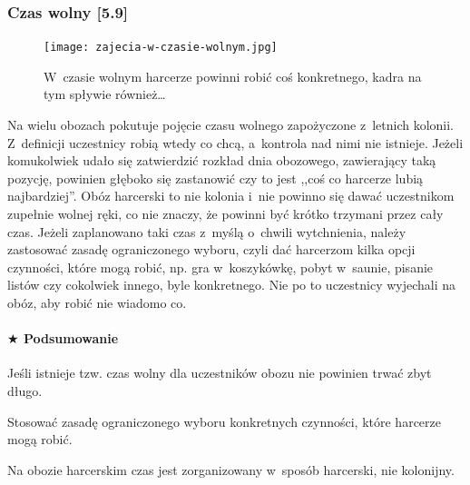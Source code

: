 \documentclass[a5paper,10pt,titlepage,twoside]{article}
\newcommand*{\thecheckbox}{\hss$\Box$} %
\newenvironment*{checklist}
{\list{}{%
\renewcommand*{\makelabel}[1]{\thecheckbox}}}
{\endlist}
\begin{document}
\subsubsection{Czas wolny [5.9]}
\begin{figure}[htp]
\centering
\texttt{[image: zajecia-w-czasie-wolnym.jpg]}
\caption{W~czasie wolnym harcerze powinni robić coś konkretnego, kadra na tym spływie również\ldots}\label{fig:czas-wolny}
\end{figure}
Na wielu obozach pokutuje pojęcie czasu wolnego zapożyczone z~letnich kolonii. Z~definicji uczestnicy robią wtedy co chcą, a~kontrola nad nimi nie istnieje. Jeżeli komukolwiek udało się zatwierdzić rozkład dnia obozowego, zawierający taką pozycję, powinien głęboko się zastanowić czy to jest ,,coś co harcerze lubią najbardziej''. Obóz harcerski to nie kolonia i~nie powinno się dawać uczestnikom zupełnie wolnej ręki, co nie znaczy, że powinni być krótko trzymani przez cały czas. Jeżeli zaplanowano taki czas z~myślą o~chwili wytchnienia, należy zastosować zasadę ograniczonego wyboru, czyli dać harcerzom kilka opcji czynności, które mogą robić, np. gra w~koszykówkę, pobyt w~saunie, pisanie listów czy cokolwiek innego, byle konkretnego. Nie po to uczestnicy wyjechali na obóz, aby robić nie wiadomo co.
\paragraph{$\bigstar$ Podsumowanie}
\begin{checklist}
\item Jeśli istnieje tzw. czas wolny dla uczestników obozu nie powinien trwać zbyt długo.
\item Stosować zasadę ograniczonego wyboru konkretnych czynności, które harcerze mogą robić.
\item Na obozie harcerskim czas jest zorganizowany w~sposób harcerski, nie kolonijny.
\end{checklist}
\end{document}
